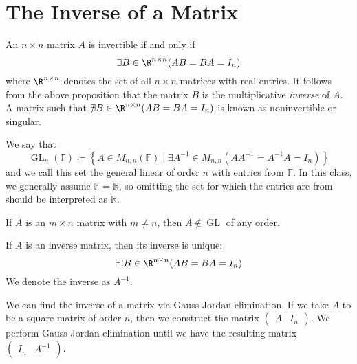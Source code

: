 \section{The Inverse of a Matrix}
\begin{definition}\label{def:4}
	An $n\times n$ matrix $A$ is invertible if and only if
	$$\exists B\in\R^{n\times n}(AB=BA=I_n)$$
	where $\R^{n\times n}$ denotes the set of all $n\times n$ matrices with real entries. It follows from the above proposition that the matrix $B$ is the multiplicative \emph{inverse} of $A$.\\
	A matrix such that $\nexists B\in\R^{n\times n}(AB=BA=I_n)$ is known as noninvertible or singular.
\end{definition}
\begin{remark}
	We say that
	\[\operatorname{GL}_n(\mathbb{F})\coloneqq \left\{ A\in M_{n,n}(\mathbb{F}) \mid \exists A^{-1} \in M_{n,n}\left( A A^{-1} =A^{-1} A = I_n \right)   \right\}  \]
	and we call this set the general linear of order \(n\) with entries from \(\mathbb{F}\). In this class, we generally assume \(\mathbb{F}=\mathbb{R}\), so omitting the set for which the entries are from should be interpreted as \(\mathbb{R}\).
\end{remark}
\begin{proposition}
	If \(A\) is an \(m\times n\) matrix with \(m\neq n\), then \(A\notin \operatorname{GL} \) of any order.
\end{proposition}
\begin{theorem}\label{thm:5}
	If $A$ is an inverse matrix, then its inverse is unique:
	$$\exists! B\in\R^{n\times n}(AB=BA=I_n)$$
	We denote the inverse as $A^{-1}$.
\end{theorem}
We can find the inverse of a matrix via Gauss-Jordan elimination. If we take $A$ to be a square matrix of order $n$, then we construct the matrix $\begin{pmatrix}A&I_n\end{pmatrix}$. We perform Gauss-Jordan elimination until we have the resulting matrix $\begin{pmatrix}I_n&A^{-1}\end{pmatrix}$.